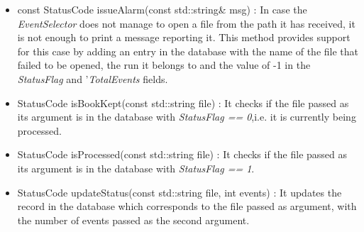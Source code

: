 \begin{itemize}
\item const StatusCode issueAlarm(const std::string& msg) : In case the \textit{EventSelector} does not manage to open a file from the path it has received, it is not enough to print a message reporting it. This method provides support for this case by adding an entry in the database with the name of the file that failed to be opened, the run it belongs to and the value of -1 in the \textit{StatusFlag} and '\textit{TotalEvents} fields.\par
\item StatusCode isBookKept(const std::string file) : It checks if the file passed as its argument is in the database with \textit{StatusFlag == 0},i.e. it is currently being processed.\par
\item StatusCode isProcessed(const std::string file) : It checks if the file passed as its argument is in the database with \textit{StatusFlag == 1}.\par
\item StatusCode updateStatus(const std::string file, int events) : It updates the record in the database which corresponds to the file passed as argument, with the number of events passed as the second argument.\par

\end{itemize}


